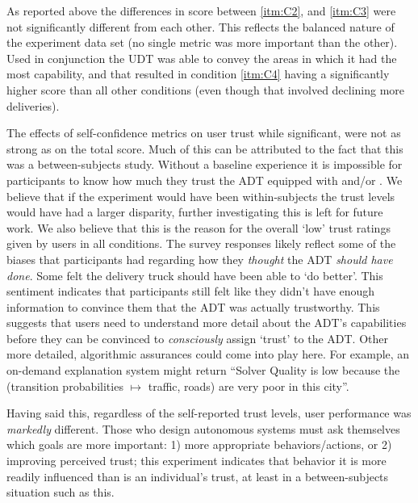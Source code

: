 As reported above the differences in score between \ref{itm:C2}, and \ref{itm:C3} were not significantly different from each other. This reflects the balanced nature of the experiment data set (no single metric was more important than the other). Used in conjunction the UDT was able to convey the areas in which it had the most capability, and that resulted in condition \ref{itm:C4} having a significantly higher score than all other conditions (even though that involved declining more deliveries).

The effects of self-confidence metrics on user trust while significant, were not as strong as on the total score. Much of this can be attributed to the fact that this was a between-subjects study. Without a baseline experience it is impossible for participants to know how much they trust the ADT equipped with \xQ{} and/or \xO. We believe that if the experiment would have been within-subjects the trust levels would have had a larger disparity, further investigating this is left for future work. We also believe that this is the reason for the overall `low' trust ratings given by users in all conditions.  The survey responses likely reflect some of the biases that participants had regarding how they \emph{thought} the ADT \emph{should have done}. Some felt the delivery truck should have been able to `do better'. This sentiment indicates that participants still felt like they didn't have enough information to convince them that the ADT was actually trustworthy. This suggests that users need to understand more detail about the ADT's capabilities before they can be convinced to \emph{consciously} assign `trust' to the ADT. Other more detailed, algorithmic assurances could come into play here. For example, an on-demand explanation system might return ``Solver Quality is low because the (transition probabilities $\mapsto$ traffic, roads) are very poor in this city''. %

Having said this, regardless of the self-reported trust levels, user performance was \emph{markedly} different. Those who design autonomous systems must ask themselves which goals are more important: 1) more appropriate behaviors/actions, or 2) improving perceived trust; this experiment indicates that behavior it is more readily influenced than is an individual's trust, at least in a between-subjects situation such as this.

